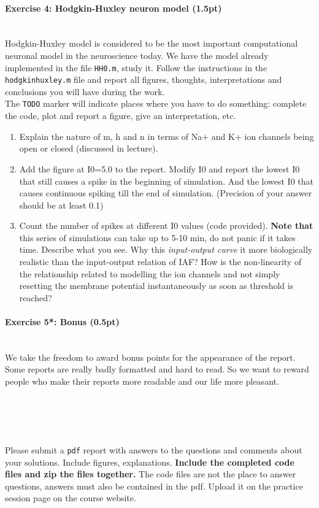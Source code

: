 \documentclass[a4paper,11pt]{article}
\newenvironment{exercise}[3]{\paragraph{Exercise #1: #2 (#3pt)}\ \\}{
\medskip}
\begin{document}
%
%
\begin{exercise}{4}{Hodgkin-Huxley neuron model}{1.5}

Hodgkin-Huxley model is considered to be the most important computational neuronal model in the neuroscience today. We have the model already implemented in the file \texttt{HH0.m}, study it. Follow the instructions in the \texttt{hodgkinhuxley.m} file and report all figures, thoughts, interpretations and conclusions you will have during the work.\\

The \texttt{TODO} marker will indicate places where you have to do something: complete the code, plot and report a figure, give an interpretation, etc.
\begin{enumerate}
\item Explain the nature of m, h and n in terms of Na+ and K+ ion channels being open or closed (discussed in lecture).
\item Add the figure at I0=5.0 to the report. Modify I0 and report the lowest I0 that still causes a spike in the beginning of simulation. And the lowest I0 that causes continuous spiking till the end of simulation. (Precision of your answer should be at least 0.1)
\item Count the number of spikes at different I0 values (code provided). \textbf{Note that} this series of simulations can take up to 5-10 min, do not panic if it takes time. Describe what you see. Why this \textit{input-output curve} it more biologically realistic than the input-output relation of IAF? How is the non-linearity of the relationship related to modelling the ion channels and not simply resetting the membrane potential instantaneously as soon as threshold is reached? 
\end{enumerate}
\end{exercise}


\begin{exercise}{5*}{Bonus}{0.5}
We take the freedom to award bonus points for the appearance of the report. Some reports are really badly formatted and hard to read. So we want to reward people who make their reports more readable and our life more pleasant.
\end{exercise}


\ \\
\ \\
\ \\
\ \\

Please submit a \texttt{pdf} report with answers to the questions and comments about your solutions. Include figures, explanations. \textbf{Include the completed code files and zip the files together.} The code files are not the place to answer questions, answers must also be contained in the pdf. Upload it on the practice session page on the course website.
\end{document}
